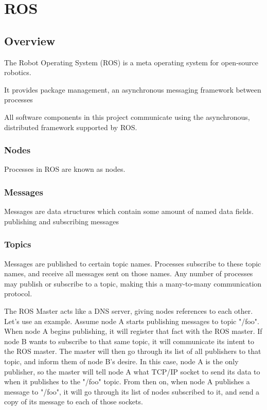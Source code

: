 \chapter{ROS}

\section{Overview}
The Robot Operating System (ROS) is a meta operating system for open-source robotics.

It provides package management, an asynchronous messaging framework between processes

All software components in this project communicate using the asynchronous, distributed framework supported by ROS.

\subsection{Nodes}
Processes in ROS are known as nodes.

\subsection{Messages}
Messages are data structures which contain some amount of named data fields.
publishing and subscribing messages

\subsection{Topics}
Messages are published to certain topic names. Processes subscribe to these topic names, and receive all messages sent on those names. Any number of processes may publish or subscribe to a topic, making this a many-to-many communication protocol.

The ROS Master acts like a DNS server, giving nodes references to each other. Let's use an example. Assume node A starts publishing messages to topic "/foo". When node A begins publishing, it will register that fact with the ROS master. If node B wants to subscribe to that same topic, it will communicate its intent to the ROS master. The master will then go through its list of all publishers to that topic, and inform them of node B's desire. In this case, node A is the only publisher, so the master will tell node A what TCP/IP socket to send its data to when it publishes to the "/foo" topic. From then on, when node A publishes a message to "/foo", it will go through its list of nodes subscribed to it, and send a copy of its message to each of those sockets.

